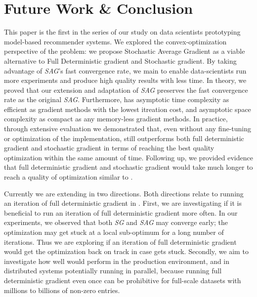 \section{Future Work \& Conclusion}
This paper is the first in the series of our study on data scientists prototyping model-based recommender systems.  
We explored the convex-optimization perspective of the problem: we propose Stochastic Average Gradient as a viable alternative to Full Deterministic gradient and Stochastic gradient.  
By taking advantage of \emph{SAG}'s fast convergence rate, we main to enable data-scientists run more experiments and produce high quality results with less time.  
In theory, we proved that our extension and adaptation of \emph{SAG} preserves the fast convergence rate as the original \emph{SAG}.  
Furthermore, \tool has asymptotic time complexity as efficient as gradient methods with the lowest itreation cost, and asymptotic space complexity as compact as any memory-less gradient methods.  
In practice, through extensive evaluation we demonstrated that, even without any fine-tuning or optimization of the implementation, 
\tool still outperforms both full deterministic gradient and stochastic gradient in terms of reaching the best quality optimization within the same amount of time.  
Following up, we provided evidence that full deterministic gradient and stochastic gradient would take much longer to reach a quality of optimization similar to \tool.

Currently we are extending \tool in two directions.  Both directions relate to running an iteration of full deterministic gradient in \tool.
First, we are investigating if it is beneficial to run an iteration of full deterministic gradient more often.  
In our experiments, we observed that both \emph{SG} and \emph{SAG} may converge early; the optimization may get stuck at a local sub-optimum for a long number of iterations.  
Thus we are exploring if an iteration of full deterministic gradient would get the optimization back on track in case \tool gets stuck.
Secondly, we aim to investigate how well \tool would perform in the production environment, and in distributed systems potentially running in parallel, because running full deterministic gradient even once can be prohibitive for full-scale datasets with millions to billions of non-zero entries.

